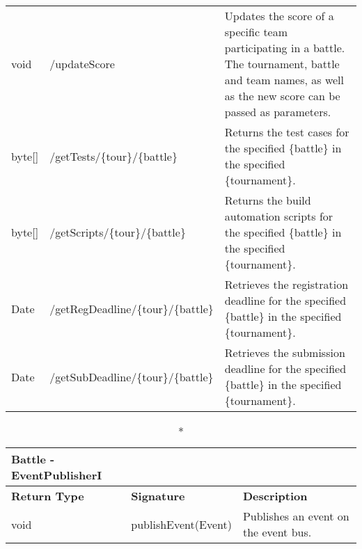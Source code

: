 \begin{longtable}{|p{2.5cm} p{6.5cm} p{4.5cm}|}
	void & /updateScore & Updates the score of a specific team participating in a battle.  The tournament, battle and team names, as well as the new score can be passed as parameters. \\
 	
	byte[] & /getTests/\{tour\}/\{battle\} & Returns the test cases for the specified \{battle\} in the specified \{tournament\}.\\
	
	byte[] &/getScripts/\{tour\}/\{battle\} & Returns the build automation scripts for the specified \{battle\} in the specified \{tournament\}.\\
	
	Date &/getRegDeadline/\{tour\}/\{battle\} & Retrieves the registration deadline for the specified \{battle\} in the specified \{tournament\}.\\
	
	Date &/getSubDeadline/\{tour\}/\{battle\} & Retrieves the submission deadline for the specified \{battle\} in the specified \{tournament\}.\\
	
	\hline
	
\end{longtable}




\begin{longtable}{|p{2.5cm} p{6.5cm} p{4.5cm}|}
\caption*{Battle - EventPublisherI}\\ 

\hline
\textbf{Return Type} & \textbf{Signature} & \textbf{Description}\\
\hline \endhead

void & publishEvent(Event)  & Publishes an event on the event bus.\\

\hline

\end{longtable}

\pagebreak


